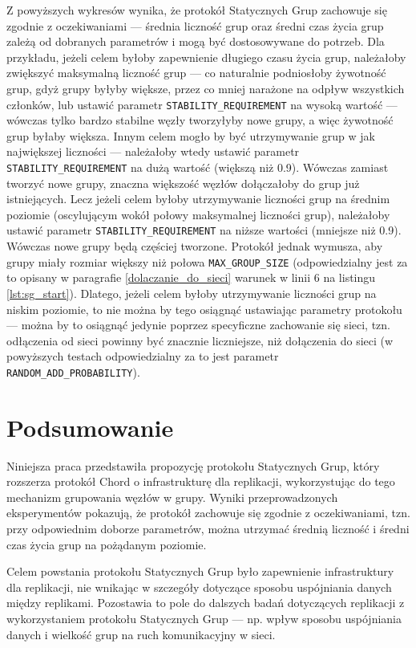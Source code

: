 \documentclass[12pt, twoside, openany]{report}
\begin{document}
Z powyższych wykresów wynika, że protokół Statycznych Grup zachowuje się zgodnie z oczekiwaniami --- średnia liczność grup oraz średni czas życia grup zależą od dobranych parametrów i mogą być dostosowywane do potrzeb. Dla przykładu, jeżeli celem byłoby zapewnienie długiego czasu życia grup, należałoby zwiększyć maksymalną liczność grup --- co naturalnie podniosłoby żywotność grup, gdyż grupy byłyby większe, przez co mniej narażone na odpływ wszystkich członków, lub ustawić parametr \texttt{STABILITY\_REQUIREMENT} na wysoką wartość --- wówczas tylko bardzo stabilne węzły tworzyłyby nowe grupy, a więc żywotność grup byłaby większa. Innym celem mogło by być utrzymywanie grup w jak największej liczności --- należałoby wtedy ustawić parametr \texttt{STABILITY\_REQUIREMENT} na dużą wartość (większą niż 0.9). Wówczas zamiast tworzyć nowe grupy, znaczna większość węzłów dołączałoby do grup już istniejących. Lecz jeżeli celem byłoby utrzymywanie liczności grup na średnim poziomie (oscylującym wokół połowy maksymalnej liczności grup), należałoby ustawić parametr \texttt{STABILITY\_REQUIREMENT} na niższe wartości (mniejsze niż 0.9). Wówczas nowe grupy będą częściej tworzone. Protokół jednak wymusza, aby grupy miały rozmiar większy niż połowa \texttt{MAX\_GROUP\_SIZE} (odpowiedzialny jest za to opisany w paragrafie \ref{dolaczanie_do_sieci} warunek w linii 6 na listingu \ref{lst:sg_start}). Dlatego, jeżeli celem byłoby utrzymywanie liczności grup na niskim poziomie, to nie można by tego osiągnąć ustawiając parametry protokołu --- można by to osiągnąć jedynie poprzez specyficzne zachowanie się sieci, tzn. odłączenia od sieci powinny być znacznie liczniejsze, niż dołączenia do sieci (w powyższych testach odpowiedzialny za to jest parametr \texttt{RANDOM\_ADD\_PROBABILITY}).

\chapter{Podsumowanie}

Niniejsza praca przedstawiła propozycję protokołu Statycznych Grup, który rozszerza protokół Chord o infrastrukturę dla replikacji, wykorzystując do tego mechanizm grupowania węzłów w grupy. Wyniki przeprowadzonych eksperymentów pokazują, że protokół zachowuje się zgodnie z oczekiwaniami, tzn. przy odpowiednim doborze parametrów, można utrzymać średnią liczność i średni czas życia grup na pożądanym poziomie.

Celem powstania protokołu Statycznych Grup było zapewnienie infrastruktury dla replikacji, nie wnikając w szczegóły dotyczące sposobu uspójniania danych między replikami. Pozostawia to pole do dalszych badań dotyczących replikacji z wykorzystaniem protokołu Statycznych Grup --- np. wpływ sposobu uspójniania danych i wielkość grup na ruch komunikacyjny w sieci.
\end{document}
